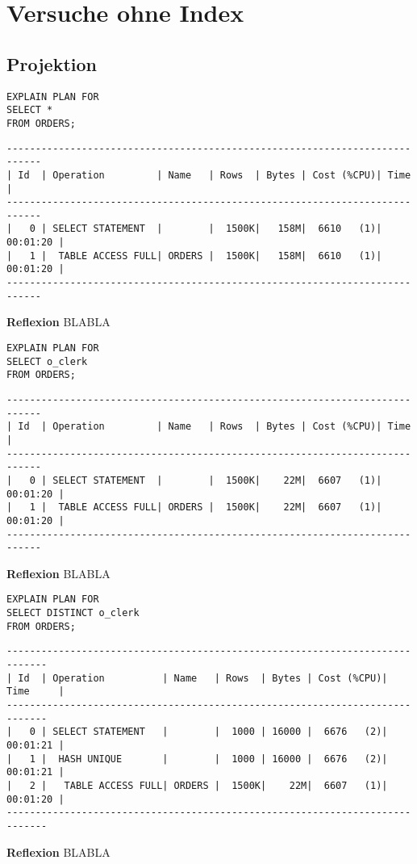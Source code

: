 \documentclass[10pt]{article}
\begin{document}
\section{Versuche ohne Index}
\subsection{Projektion}
\begin{lstlisting}[style=sql]
EXPLAIN PLAN FOR
SELECT *
FROM ORDERS;
\end{lstlisting}
\begin{lstlisting}[style=queryexecutionplan]
----------------------------------------------------------------------------
| Id  | Operation         | Name   | Rows  | Bytes | Cost (%CPU)| Time     |
----------------------------------------------------------------------------
|   0 | SELECT STATEMENT  |        |  1500K|   158M|  6610   (1)| 00:01:20 |
|   1 |  TABLE ACCESS FULL| ORDERS |  1500K|   158M|  6610   (1)| 00:01:20 |
----------------------------------------------------------------------------
\end{lstlisting}
\textbf{Reflexion} \newline
BLABLA

\begin{lstlisting}[style=sql]
EXPLAIN PLAN FOR
SELECT o_clerk
FROM ORDERS;
\end{lstlisting}
\begin{lstlisting}[style=queryexecutionplan]
----------------------------------------------------------------------------
| Id  | Operation         | Name   | Rows  | Bytes | Cost (%CPU)| Time     |
----------------------------------------------------------------------------
|   0 | SELECT STATEMENT  |        |  1500K|    22M|  6607   (1)| 00:01:20 |
|   1 |  TABLE ACCESS FULL| ORDERS |  1500K|    22M|  6607   (1)| 00:01:20 |
----------------------------------------------------------------------------
\end{lstlisting}
\textbf{Reflexion} \newline
BLABLA

\begin{lstlisting}[style=sql]
EXPLAIN PLAN FOR
SELECT DISTINCT o_clerk
FROM ORDERS;
\end{lstlisting}
\begin{lstlisting}[style=queryexecutionplan]
-----------------------------------------------------------------------------
| Id  | Operation          | Name   | Rows  | Bytes | Cost (%CPU)| Time     |
-----------------------------------------------------------------------------
|   0 | SELECT STATEMENT   |        |  1000 | 16000 |  6676   (2)| 00:01:21 |
|   1 |  HASH UNIQUE       |        |  1000 | 16000 |  6676   (2)| 00:01:21 |
|   2 |   TABLE ACCESS FULL| ORDERS |  1500K|    22M|  6607   (1)| 00:01:20 |
-----------------------------------------------------------------------------
\end{lstlisting}
\textbf{Reflexion} \newline
BLABLA
\end{document}
